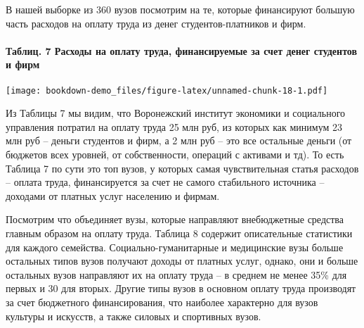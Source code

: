 \documentclass[]{book}
\let\oldparagraph\paragraph
\renewcommand{\paragraph}[1]{\oldparagraph{#1}\mbox{}}
\begin{document}
В нашей выборке из 360 вузов посмотрим на те, которые финансируют большую часть расходов на оплату труда из денег студентов-платников и фирм.

\hypertarget{ux442ux430ux431ux43bux438ux446.-7-ux440ux430ux441ux445ux43eux434ux44b-ux43dux430-ux43eux43fux43bux430ux442ux443-ux442ux440ux443ux434ux430-ux444ux438ux43dux430ux43dux441ux438ux440ux443ux435ux43cux44bux435-ux437ux430-ux441ux447ux435ux442-ux434ux435ux43dux435ux433-ux441ux442ux443ux434ux435ux43dux442ux43eux432-ux438-ux444ux438ux440ux43c}{%
\paragraph{Таблиц. 7 Расходы на оплату труда, финансируемые за счет денег студентов и фирм}\label{ux442ux430ux431ux43bux438ux446.-7-ux440ux430ux441ux445ux43eux434ux44b-ux43dux430-ux43eux43fux43bux430ux442ux443-ux442ux440ux443ux434ux430-ux444ux438ux43dux430ux43dux441ux438ux440ux443ux435ux43cux44bux435-ux437ux430-ux441ux447ux435ux442-ux434ux435ux43dux435ux433-ux441ux442ux443ux434ux435ux43dux442ux43eux432-ux438-ux444ux438ux440ux43c}}

\texttt{[image: bookdown-demo\_files/figure-latex/unnamed-chunk-18-1.pdf]}

Из Таблицы 7 мы видим, что Воронежский институт экономики и социального управления потратил на оплату труда 25 млн руб, из которых как минимум 23 млн руб -- деньги студентов и фирм, а 2 млн руб -- это все остальные деньги (от бюджетов всех уровней, от собственности, операций с активами и тд). То есть Таблица 7 по сути это топ вузов, у которых самая чувствительная статья расходов -- оплата труда, финансируется за счет не самого стабильного источника -- доходами от платных услуг населению и фирмам.

Посмотрим что объединяет вузы, которые направляют внебюджетные средства главным образом на оплату труда. Таблица 8 содержит описательные статистики для каждого семейства. Социально-гуманитарные и медицинские вузы больше остальных типов вузов получают доходы от платных услуг, однако, они и больше остальных вузов направляют их на оплату труда -- в среднем не менее 35\% для первых и 30 для вторых. Другие типы вузов в основном оплату труда производят за счет бюджетного финансирования, что наиболее характерно для вузов культуры и искусств, а также силовых и спортивных вузов.
\end{document}
